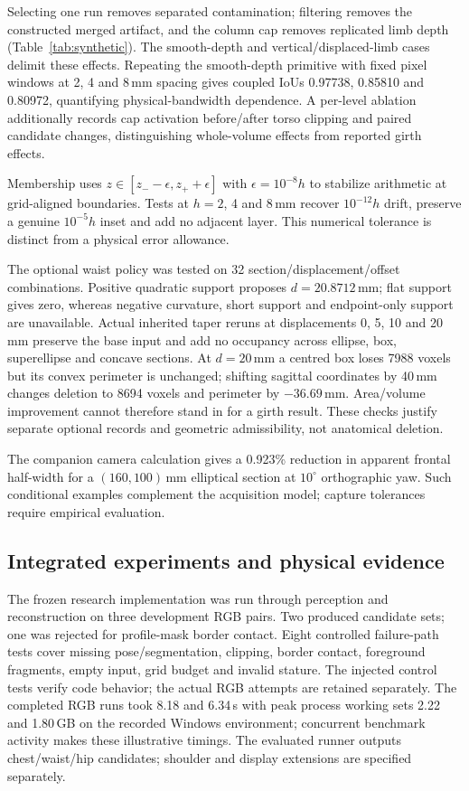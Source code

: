 \documentclass[11pt,a4paper]{article}
\begin{document}
Selecting one run removes separated contamination; filtering removes the constructed merged artifact, and the column cap removes replicated limb depth (Table~\ref{tab:synthetic}). The smooth-depth and vertical/displaced-limb cases delimit these effects. Repeating the smooth-depth primitive with fixed pixel windows at 2, 4 and 8\,mm spacing gives coupled IoUs 0.97738, 0.85810 and 0.80972, quantifying physical-bandwidth dependence. A per-level ablation additionally records cap activation before/after torso clipping and paired candidate changes, distinguishing whole-volume effects from reported girth effects.

Membership uses $z\in[z_- -\epsilon,z_++\epsilon]$ with $\epsilon=10^{-8}h$ to stabilize arithmetic at grid-aligned boundaries. Tests at $h=2$, 4 and 8\,mm recover $10^{-12}h$ drift, preserve a genuine $10^{-5}h$ inset and add no adjacent layer. This numerical tolerance is distinct from a physical error allowance.

The optional waist policy was tested on 32 section/displacement/offset combinations. Positive quadratic support proposes $d=20.8712$\,mm; flat support gives zero, whereas negative curvature, short support and endpoint-only support are unavailable. Actual inherited taper reruns at displacements 0, 5, 10 and 20\,mm preserve the base input and add no occupancy across ellipse, box, superellipse and concave sections. At $d=20$\,mm a centred box loses 7988 voxels but its convex perimeter is unchanged; shifting sagittal coordinates by 40\,mm changes deletion to 8694 voxels and perimeter by $-36.69$\,mm. Area/volume improvement cannot therefore stand in for a girth result. These checks justify separate optional records and geometric admissibility, not anatomical deletion.

The companion camera calculation gives a 0.923\% reduction in apparent frontal half-width for a $(160,100)$\,mm elliptical section at $10^\circ$ orthographic yaw. Such conditional examples complement the acquisition model; capture tolerances require empirical evaluation.

\subsection{Integrated experiments and physical evidence}
The frozen research implementation was run through perception and reconstruction on three development RGB pairs. Two produced candidate sets; one was rejected for profile-mask border contact. Eight controlled failure-path tests cover missing pose/segmentation, clipping, border contact, foreground fragments, empty input, grid budget and invalid stature. The injected control tests verify code behavior; the actual RGB attempts are retained separately. The completed RGB runs took 8.18 and 6.34\,s with peak process working sets 2.22 and 1.80\,GB on the recorded Windows environment; concurrent benchmark activity makes these illustrative timings. The evaluated runner outputs chest/waist/hip candidates; shoulder and display extensions are specified separately.
\end{document}
